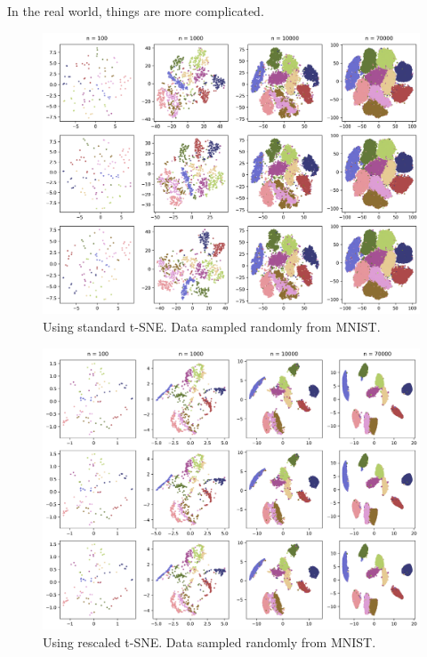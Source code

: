 In the real world, things are more complicated. 

\begin{figure}[h]
    \centering 
        \includegraphics[width=\linewidth]{figures/rescaled/MNIST_standard_embedding_grid.png}
        \caption{Using standard t-SNE. Data sampled randomly from MNIST.}
    \label{fig:MNIST-standard}
\end{figure}

\begin{figure}[h]
    \centering 
        \includegraphics[width=\linewidth]{figures/rescaled/MNIST_rescaled_embedding_grid.png}
        \caption{Using rescaled t-SNE. Data sampled randomly from MNIST.}
    \label{fig:MNIST-rescaled}
\end{figure}
\newpage 

